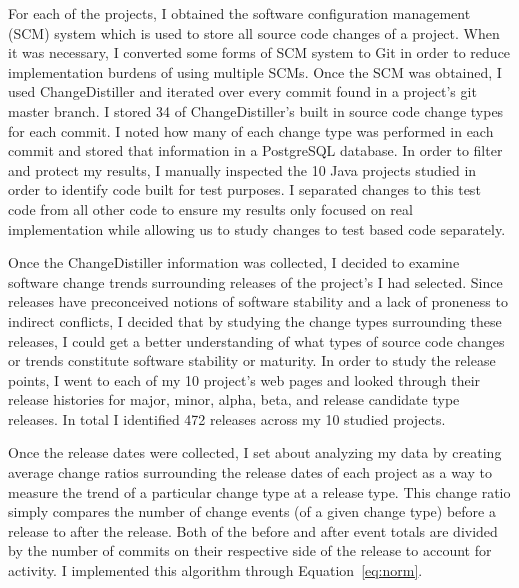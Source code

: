 For each of the projects, I obtained the software configuration management (SCM) system
which is used to store all source code changes of a project. When it was necessary, I converted some forms of SCM system to Git in order to reduce implementation
burdens of using multiple SCMs. Once the SCM was obtained, I used ChangeDistiller and iterated over every commit found in a project's git master branch. I stored
34 of ChangeDistiller's built in source code change types for each commit. I noted how many of each change type was performed in each commit and stored that information
in a PostgreSQL database. In order to filter and protect my results, I manually inspected the 10 Java projects studied in order to identify code built for test
purposes.
I separated changes to this test code from all other code to ensure my results only focused on real implementation while allowing us to study changes to
test based code separately.

Once the ChangeDistiller information was collected, I decided to examine software change trends surrounding releases of the project's I had selected. Since releases
have preconceived notions of software stability and a lack of proneness to indirect conflicts, 
I decided that by studying the change types surrounding these releases, I could get a better understanding of
what types of source code changes or trends constitute software stability or maturity. In order to study the release points, I went to each of my 10 project's 
web pages and looked through their release histories for major, minor, alpha, beta, and release candidate type releases. In total I identified 472 releases
across my 10 studied projects.  

Once the release dates were collected, I set about analyzing my data by creating average change ratios surrounding the release dates of each 
project as a way to measure the trend of a particular change type at a release type. This change ratio simply compares the number of change events (of a given
change type) before a release to after the release. Both of the before and after event totals are divided by the number of commits on their respective side
of the release to account for activity. I implemented this algorithm through Equation~\ref{eq:norm}.

